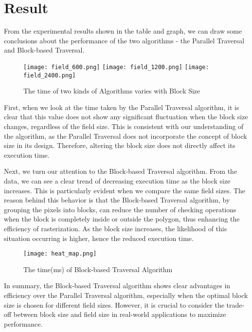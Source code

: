 \documentclass[
	a4paper, %
	10pt, %
	unnumberedsections, %
	twoside, %
]{LTJournalArticle}
\begin{document}

\section{Result}

From the experimental results shown in the table and graph, we can draw some conclusions about the performance of the two algorithms - the Parallel Traversal and Block-based Traversal.

\begin{figure}[H] %
	\texttt{[image: field\_600.png]}
	\texttt{[image: field\_1200.png]}
	\texttt{[image: field\_2400.png]}
	\caption{The time of two kinds of Algorithms varies with Block Size}
\end{figure}

First, when we look at the time taken by the Parallel Traversal algorithm, it is clear that this value does not show any significant fluctuation when the block size changes, regardless of the field size. This is consistent with our understanding of the algorithm, as the Parallel Traversal does not incorporate the concept of block size in its design. Therefore, altering the block size does not directly affect its execution time.

Next, we turn our attention to the Block-based Traversal algorithm. From the data, we can see a clear trend of decreasing execution time as the block size increases. This is particularly evident when we compare the same field sizes. The reason behind this behavior is that the Block-based Traversal algorithm, by grouping the pixels into blocks, can reduce the number of checking operations when the block is completely inside or outside the polygon, thus enhancing the efficiency of rasterization. As the block size increases, the likelihood of this situation occurring is higher, hence the reduced execution time.

\begin{figure}[H] %
	\texttt{[image: heat\_map.png]}
	\caption{The time(ms) of Block-based Traversal Algorithm}
\end{figure}

In summary, the Block-based Traversal algorithm shows clear advantages in efficiency over the Parallel Traversal algorithm, especially when the optimal block size is chosen for different field sizes. However, it is crucial to consider the trade-off between block size and field size in real-world applications to maximize performance.
\end{document}
